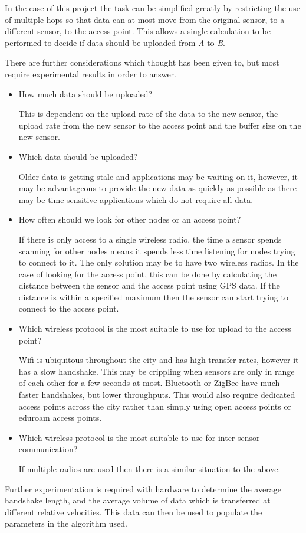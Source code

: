In the case of this project the task can be simplified greatly by restricting the use of multiple hops so that data can at most move from the original sensor, to a different sensor, to the access point. This allows a single calculation to be performed to decide if data should be uploaded from \emph{A} to \emph{B}. 

There are further considerations which thought has been given to, but most require experimental results in order to answer. 

\begin{itemize}
	\item How much data should be uploaded?

		This is dependent on the upload rate of the data to the new sensor, the upload rate from the new sensor to the access point and the buffer size on the new sensor. 

	\item Which data should be uploaded?

		Older data is getting stale and applications may be waiting on it, however, it may be advantageous to provide the new data as quickly as possible as there may be time sensitive applications which do not require all data. 

	\item How often should we look for other nodes or an access point?

		If there is only access to a single wireless radio, the time a sensor spends scanning for other nodes means it spends less time listening for nodes trying to connect to it. The only solution may be to have two wireless radios. In the case of looking for the access point, this can be done by calculating the distance between the sensor and the access point using GPS data. If the distance is within a specified maximum then the sensor can start trying to connect to the access point. 

	\item Which wireless protocol is the most suitable to use for upload to the access point?

		Wifi is ubiquitous throughout the city and has high transfer rates, however it has a slow handshake. This may be crippling when sensors are only in range of each other for a few seconds at most. Bluetooth or ZigBee have much faster handshakes, but lower throughputs. This would also require dedicated access points across the city rather than simply using open access points or eduroam access points.

	\item Which wireless protocol is the most suitable to use for inter-sensor communication?

		If multiple radios are used then there is a similar situation to the above. 

\end{itemize}


Further experimentation is required with hardware to determine the average handshake length, and the average volume of data which is transferred at different relative velocities. This data can then be used to populate the parameters in the algorithm used. 




